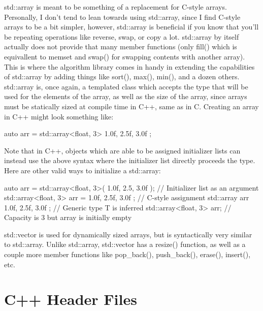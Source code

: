 \documentclass{article}
\begin{document}
std::array is meant to be something of a replacement for C-style arrays. Personally, I don’t tend to lean
towards using std::array, since I find C-style arrays to be a bit simpler, however, std::array is beneficial
if you know that you’ll be repeating operations like reverse, swap, or copy a lot. std::array by itself
actually does not provide that many member functions (only fill() which is equivallent to memset and swap()
for swapping contents with another array). This is where the algorithm library comes in handy in extending the
capabilities of std::array by adding things like sort(), max(), min(), and a dozen others. std::array is, once
again, a templated class which accepts the type that will be used for the elements of the array, as well as
the size of the array, since arrays must be statically sized at compile time in C++, same as in C. Creating an
array in C++ might look something like:

\begin{cpplst}
auto arr = std::array<float, 3>{ 1.0f, 2.5f, 3.0f };
\end{cpplst}

Note that in C++, objects which are able to be assigned initializer lists can instead use the above syntax
where the initializer list directly proceeds the type. Here are other valid ways to initialize a std::array:

\begin{cpplst}
auto arr = std::array<float, 3>({ 1.0f, 2.5, 3.0f }); // Initializer list as an argument
std::array<float, 3> arr = { 1.0f, 2.5f, 3.0f }; // C-style assignment
std::array arr{ 1.0f, 2.5f, 3.0f }; // Generic type T is inferred
std::array<float, 3> arr{}; // Capacity is 3 but array is initially empty
\end{cpplst}

std::vector is used for dynamically sized arrays, but is syntactically very similar to std::array. Unlike
std::array, std::vector has a resize() function, as well as a couple more member functions like pop\_back(),
push\_back(), erase(), insert(), etc.

\section{C++ Header Files}
\end{document}
